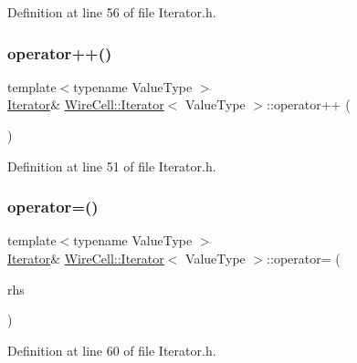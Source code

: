 Definition at line 56 of file Iterator.\+h.

\mbox{\label{class_wire_cell_1_1_iterator_a33087f833e9684b9de60c00cf5081e51}} 
\subsubsection{\texorpdfstring{operator++()}{operator++()}}
{\footnotesize\ttfamily template$<$typename Value\+Type $>$ \\
\hyperlink{class_wire_cell_1_1_iterator}{Iterator}\& \hyperlink{class_wire_cell_1_1_iterator}{Wire\+Cell\+::\+Iterator}$<$ Value\+Type $>$\+::operator++ (\begin{DoxyParamCaption}{ }\end{DoxyParamCaption})\hspace{0.3cm}{\ttfamily [inline]}}



Definition at line 51 of file Iterator.\+h.

\mbox{\label{class_wire_cell_1_1_iterator_a54ed727bdcc60aeab52fd8bee3feffa1}} 
\subsubsection{\texorpdfstring{operator=()}{operator=()}}
{\footnotesize\ttfamily template$<$typename Value\+Type $>$ \\
\hyperlink{class_wire_cell_1_1_iterator}{Iterator}\& \hyperlink{class_wire_cell_1_1_iterator}{Wire\+Cell\+::\+Iterator}$<$ Value\+Type $>$\+::operator= (\begin{DoxyParamCaption}\item[{const \hyperlink{class_wire_cell_1_1_iterator}{Iterator}$<$ Value\+Type $>$ \&}]{rhs }\end{DoxyParamCaption})\hspace{0.3cm}{\ttfamily [inline]}}



Definition at line 60 of file Iterator.\+h.

